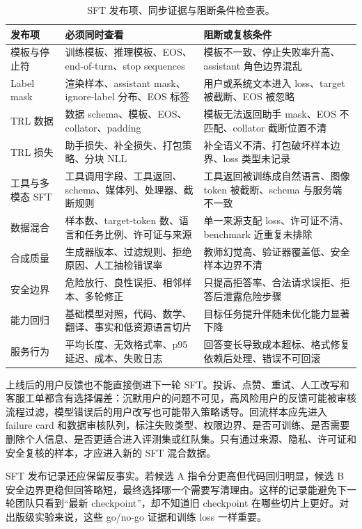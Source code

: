 \documentclass[UTF8,zihao=-4,openany]{ctexbook}
\begin{document}
\begin{table}[t]
\centering
\small
\begin{tabular}{p{}p{}p{}}
\toprule
发布项 & 必须同时查看 & 阻断或复核条件 \\
\midrule
模板与停止符 & 训练模板、推理模板、EOS、end-of-turn、stop sequences & 模板不一致、停止失败率升高、assistant 角色边界混乱 \\
Label mask & 渲染样本、assistant mask、ignore-label 分布、EOS 标签 & 用户或系统文本进入 loss、target 被截断、EOS 被忽略 \\
TRL 数据 & 数据 schema、模板、EOS、collator、padding & 模板无法返回助手 mask、EOS 不匹配、collator 截断位置不清 \\
TRL 损失 & 助手损失、补全损失、打包策略、分块 NLL & 补全语义不清、打包破坏样本边界、loss 类型未记录 \\
工具与多模态 SFT & 工具调用字段、工具返回、schema、媒体列、处理器、截断规则 & 工具返回被训练成自然语言、图像 token 被截断、schema 与服务端不一致 \\
数据混合 & 样本数、target-token 数、语言和任务比例、许可证与来源 & 单一来源支配 loss、许可证不清、benchmark 近重复未排除 \\
合成质量 & 生成器版本、过滤规则、拒绝原因、人工抽检错误率 & 教师幻觉高、验证器覆盖低、安全样本边界不清 \\
安全边界 & 危险放行、良性误拒、相邻样本、多轮修正 & 只提高拒答率、合法请求误拒、拒答后泄露危险步骤 \\
能力回归 & 基础模型对照，代码、数学、翻译、事实和低资源语言切片 & 目标任务提升伴随未优化能力显著下降 \\
服务行为 & 平均长度、无效格式率、p95 延迟、成本、失败日志 & 回答变长导致成本超标、格式修复依赖后处理、错误不可回滚 \\
\bottomrule
\end{tabular}
\caption{SFT 发布项、同步证据与阻断条件检查表。}
\label{tab:zh-sft-release-go-nogo}
\end{table}

上线后的用户反馈也不能直接倒进下一轮 SFT。投诉、点赞、重试、人工改写和客服工单都含有选择偏差：沉默用户的问题不可见，高风险用户的反馈可能被审核流程过滤，模型错误后的用户改写也可能带入策略诱导。回流样本应先进入 failure card 和数据审核队列，标注失败类型、权限边界、是否可训练、是否需要删除个人信息、是否更适合进入评测集或红队集。只有通过来源、隐私、许可证和安全复核的样本，才应进入新的 SFT 混合数据。

SFT 发布记录还应保留反事实。若候选 A 指令分更高但代码回归明显，候选 B 安全边界更稳但回答略短，最终选择哪一个需要写清理由。这样的记录能避免下一轮团队只看到“最新 checkpoint”，却不知道旧 checkpoint 在哪些切片上更好。对出版级实验来说，这些 go/no-go 证据和训练 loss 一样重要。
\end{document}
